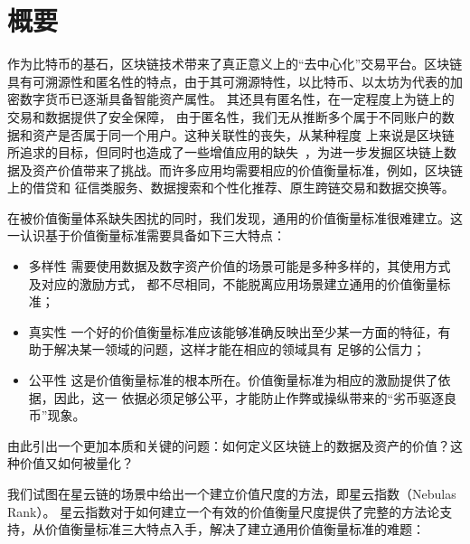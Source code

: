 \section{概要}
作为比特币的基石，区块链技术带来了真正意义上的“去中心化”交易平台。区块链具有可溯源性和匿名性的特点，由于其可溯源特性，以比特币、以太坊为代表的加密数字货币已逐渐具备智能资产属性。
其还具有匿名性，在一定程度上为链上的交易和数据提供了安全保障，
由于匿名性，我们无从推断多个属于不同账户的数据和资产是否属于同一个用户。这种关联性的丧失，从某种程度
上来说是区块链所追求的目标，但同时也造成了一些增值应用的缺失~\cite{meiklejohn2013fistful}，为进一步发掘区块链上数据及资产价值带来了挑战。而许多应用均需要相应的价值衡量标准，例如，区块链上的借贷和
征信类服务、数据搜索和个性化推荐、原生跨链交易和数据交换等。



在被价值衡量体系缺失困扰的同时，我们发现，通用的价值衡量标准很难建立。这一认识基于价值衡量标准需要具备如下三大特点：

\begin{itemize}
\item{多样性} 需要使用数据及数字资产价值的场景可能是多种多样的，其使用方式及对应的激励方式，
都不尽相同，不能脱离应用场景建立通用的价值衡量标准；
\item{真实性} 一个好的价值衡量标准应该能够准确反映出至少某一方面的特征，有助于解决某一领域的问题，这样才能在相应的领域具有
足够的公信力；
\item{公平性} 这是价值衡量标准的根本所在。价值衡量标准为相应的激励提供了依据，因此，这一
依据必须足够公平，才能防止作弊或操纵带来的“劣币驱逐良币”现象。
\end{itemize}

由此引出一个更加本质和关键的问题：如何定义区块链上的数据及资产的价值？这种价值又如何被量化？


我们试图在星云链的场景中给出一个建立价值尺度的方法，即星云指数（Nebulas Rank）。
星云指数对于如何建立一个有效的价值衡量尺度提供了完整的方法论支持，从价值衡量标准三大特点入手，解决了建立通用价值衡量标准的难题：

